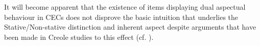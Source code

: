It will become apparent that the existence of items displaying dual
aspectual behaviour in CECs does not disprove the basic intuition that
underlies the Stative\slash Non-stative distinction and inherent aspect
despite arguments that have been made in Creole studies to this effect
(cf. \citealt{Jaganauth1987}).

